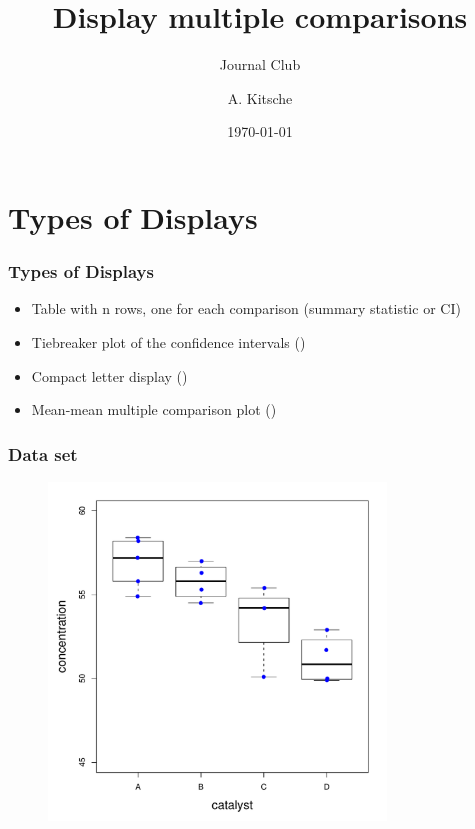 \documentclass{beamer}
\title{Display multiple comparisons}
\subtitle{Journal Club}
\institute[Institute of Biostatistics]{Institute of Biostatistics\\ \url{andreaskitsche@gmail.com}}
\author{A. Kitsche}
\date{\today}
\begin{document}
\frame{\titlepage}




\section{Types of Displays}
\begin{frame}
\frametitle{Types of Displays}
\begin{itemize}
\item Table with n rows, one for each comparison (summary statistic or CI)
\item Tiebreaker plot of the confidence intervals (\cite{Bretz.2010})
\item Compact letter display (\cite{Piepho.2004})
\item Mean-mean multiple comparison plot (\cite{Heiberger.2006, Heiberger.2010})
\end{itemize}
\end{frame}

\begin{frame}
\frametitle{Data set}
\begin{figure}
	\centering
		\includegraphics[width=0.80\textwidth]{Boxplot_catalyst.pdf}
	\label{fig:Boxplot_catalyst}
\end{figure}

\end{frame}
\end{document}
